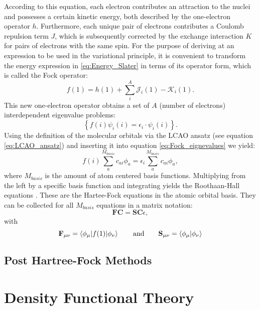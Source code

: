 According to this equation, each electron contributes an attraction to the nuclei and possesses a certain kinetic energy, both described by the one-electron operator $h$. Furthermore, each unique pair of electrons contributes a Coulomb repulsion term $J$, which is subsequently corrected by the exchange interaction $K$ for pairs of electrons with the same spin. For the purpose of deriving at an expression to be used in the variational principle, it is convenient to transform the energy expression in \ref{eq:Energy_Slater} in terms of its operator form, which is called the Fock operator:
\begin{equation}
    f(1) = h(1) + \sum_{i}^{A}\mathcal{J}_{i}(1)-\mathcal{K}_{i}(1).
    \label{eq:fock_operator}
\end{equation}
This new one-electron operator obtains a set of $A$ (number of electrons) interdependent eigenvalue problems: 
\begin{equation}
    \left\{
    f(i)\psi_{i}(i) = \epsilon_{i} \cdot \psi_{i}(i) \right\}.
    \label{eq:Fock_eignevalues}
\end{equation}
Using the definition of the molecular orbitals via the LCAO ansatz (see equation \ref{eq:LCAO_ansatz}) and inserting it into equation \ref{eq:Fock_eignevalues} we yield:
\begin{equation}
    f(i)\sum_{a}^{M_{basis}}c_{ai}\phi_{a} = \epsilon_{i}\sum_{a}^{M_{basis}}c_{ai}\phi_{a},
    \label{eq:Fock_eignevalues_plugged_in}
\end{equation}
where $M_{basis}$ is the amount of atom centered basis functions. Multiplying from the left by a specific basis function and integrating yields the Roothaan-Hall equations \cite{RevModPhys.23.69}. These are the Hartee-Fock equations in the atomic orbital basis. They can be collected for all $M_{basis}$ equations in a matrix notation:
\begin{equation}
    \textbf{FC} = \textbf{SC}\epsilon, 
    \label{eq:Hartree_fock_equation_matrix}
\end{equation}
with 
\begin{equation}
    \textbf{F}_{\mu\nu} = \braket{\phi_{\mu}|f(1)|\phi_{\nu}} \qquad \mathrm{and} \qquad \textbf{S}_{\mu\nu} = \braket{\phi_{\mu}|\phi_{\nu}}
    \label{eq:Fock_matrix}
\end{equation}
\subsection{Post Hartree-Fock Methods}
\label{sec:Post_Hartree-Fock_Methods}

\section{Density Functional Theory}
\label{sec:DFT}